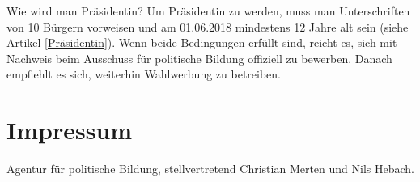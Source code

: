 \documentclass{sasbase}
\begin{document}
\begin{question}{Wie wird man Pr\"{a}sidentin?}
	Um Pr\"{a}sidentin zu werden, muss man Unterschriften von 10 B\"{u}rgern vorweisen und am 01.06.2018 mindestens 12 Jahre alt sein (siehe Artikel \ref{Präsidentin}). Wenn beide Bedingungen erf\"{u}llt sind, reicht es, sich mit Nachweis beim Ausschuss f\"{u}r politische Bildung offiziell zu bewerben. Danach empfiehlt es sich, weiterhin Wahlwerbung zu betreiben.
\end{question}

\section{Impressum}
Agentur f\"{u}r politische Bildung, stellvertretend Christian Merten und Nils Hebach.
\end{document}
